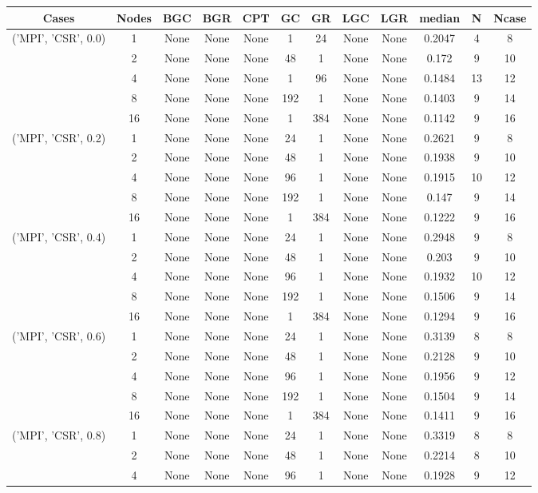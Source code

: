 \begin{tabular}{cccccccccccc}
\hline
Cases & Nodes& BGC& BGR& CPT& GC& GR& LGC& LGR& median & N & Ncase \\
\hline
\multirow{5}{*}{('MPI', 'CSR', 0.0)}& 1& None& None& None& 1& 24& None& None& 0.2047& 4& 8\\
& 2& None& None& None& 48& 1& None& None& 0.172& 9& 10\\
& 4& None& None& None& 1& 96& None& None& 0.1484& 13& 12\\
& 8& None& None& None& 192& 1& None& None& 0.1403& 9& 14\\
& 16& None& None& None& 1& 384& None& None& 0.1142& 9& 16\\
\hline
\multirow{5}{*}{('MPI', 'CSR', 0.2)}& 1& None& None& None& 24& 1& None& None& 0.2621& 9& 8\\
& 2& None& None& None& 48& 1& None& None& 0.1938& 9& 10\\
& 4& None& None& None& 96& 1& None& None& 0.1915& 10& 12\\
& 8& None& None& None& 192& 1& None& None& 0.147& 9& 14\\
& 16& None& None& None& 1& 384& None& None& 0.1222& 9& 16\\
\hline
\multirow{5}{*}{('MPI', 'CSR', 0.4)}& 1& None& None& None& 24& 1& None& None& 0.2948& 9& 8\\
& 2& None& None& None& 48& 1& None& None& 0.203& 9& 10\\
& 4& None& None& None& 96& 1& None& None& 0.1932& 10& 12\\
& 8& None& None& None& 192& 1& None& None& 0.1506& 9& 14\\
& 16& None& None& None& 1& 384& None& None& 0.1294& 9& 16\\
\hline
\multirow{5}{*}{('MPI', 'CSR', 0.6)}& 1& None& None& None& 24& 1& None& None& 0.3139& 8& 8\\
& 2& None& None& None& 48& 1& None& None& 0.2128& 9& 10\\
& 4& None& None& None& 96& 1& None& None& 0.1956& 9& 12\\
& 8& None& None& None& 192& 1& None& None& 0.1504& 9& 14\\
& 16& None& None& None& 1& 384& None& None& 0.1411& 9& 16\\
\hline
\multirow{5}{*}{('MPI', 'CSR', 0.8)}& 1& None& None& None& 24& 1& None& None& 0.3319& 8& 8\\
& 2& None& None& None& 48& 1& None& None& 0.2214& 8& 10\\
& 4& None& None& None& 96& 1& None& None& 0.1928& 9& 12\\

\end{tabular}
